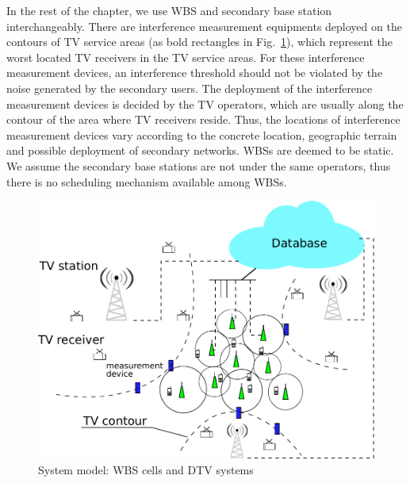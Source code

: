 \documentclass[times]{ettauth}
\theoremstyle{mytheoremstyle}
\theoremstyle{mytheoremstyle}
\theoremstyle{mytheoremstyle}
\begin{document}
In the rest of the chapter, we use WBS and secondary base station interchangeably. 
There are interference measurement equipments deployed on the contours of TV service areas (as bold rectangles in Fig.~\ref{sysmodel}), which represent the worst located TV receivers in the TV service areas. 
For these interference measurement devices, an interference threshold should not be violated by the noise generated by the secondary users.
The deployment of the interference measurement devices is decided by the TV operators, which are usually along the contour of the area where TV receivers reside.
Thus, the locations of interference measurement devices vary according to the concrete location, geographic terrain and possible deployment of secondary networks. 
WBSs are deemed to be static.
We assume the secondary base stations are not under the same operators, thus there is no scheduling mechanism available among WBSs.



\begin{figure}[h!]
  \centering
  \includegraphics[width=0.9\linewidth]{systemmodel_working.pdf}
  \caption{System model: WBS cells and DTV systems}
\label{sysmodel}
\end{figure}
\end{document}
